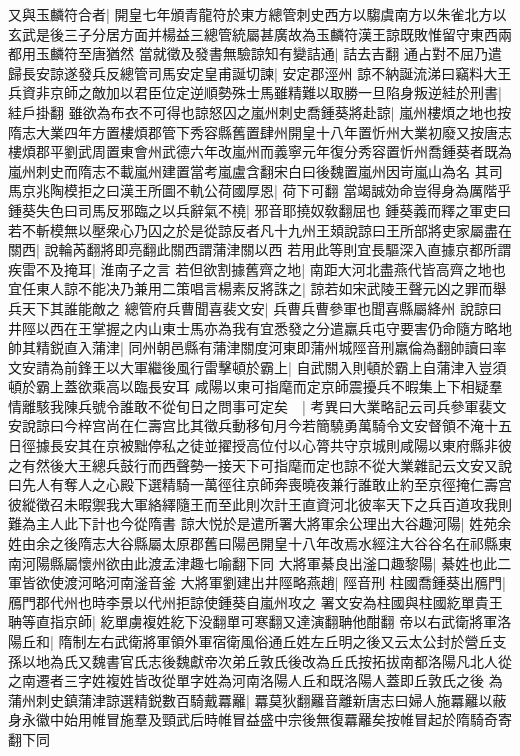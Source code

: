又與玉麟符合者|{
	開皇七年頒青龍符於東方總管刺史西方以騶虞南方以朱雀北方以玄武是後三子分居方面并楊益三總管統屬甚廣故為玉麟符漢王諒既敗惟留守東西兩都用玉麟符至唐猶然}
當就徵及發書無驗諒知有變詰通|{
	詰去吉翻}
通占對不屈乃遣歸長安諒遂發兵反總管司馬安定皇甫誕切諫|{
	安定郡涇州}
諒不納誕流涕曰竊料大王兵資非京師之敵加以君臣位定逆順勢殊士馬雖精難以取勝一旦陷身叛逆絓於刑書|{
	絓戶掛翻}
雖欲為布衣不可得也諒怒囚之嵐州刺史喬鍾葵將赴諒|{
	嵐州樓煩之地也按隋志大業四年方置樓煩郡管下秀容縣舊置肆州開皇十八年置忻州大業初廢又按唐志樓煩郡平劉武周置東會州武德六年改嵐州而義寧元年復分秀容置忻州喬鍾葵者既為嵐州刺史而隋志不載嵐州建置當考嵐盧含翻宋白曰後魏置嵐州因岢嵐山為名}
其司馬京兆陶模拒之曰漢王所圖不軌公荷國厚恩|{
	荷下可翻}
當竭誠効命豈得身為厲階乎鍾葵失色曰司馬反邪臨之以兵辭氣不橈|{
	邪音耶撓奴敎翻屈也}
鍾葵義而釋之軍吏曰若不斬模無以壓衆心乃囚之於是從諒反者凡十九州王頍說諒曰王所部將吏家屬盡在關西|{
	說輪芮翻將即亮翻此關西謂蒲津關以西}
若用此等則宜長驅深入直據京都所謂疾雷不及掩耳|{
	淮南子之言}
若但欲割據舊齊之地|{
	南距大河北盡燕代皆高齊之地也}
宜任東人諒不能决乃兼用二策唱言楊素反將誅之|{
	諒若如宋武陵王聲元凶之罪而舉兵天下其誰能敵之}
總管府兵曹聞喜裴文安|{
	兵曹兵曹參軍也聞喜縣屬絳州}
說諒曰井陘以西在王掌握之内山東士馬亦為我有宜悉發之分遣羸兵屯守要害仍命隨方略地帥其精鋭直入蒲津|{
	同州朝邑縣有蒲津關度河東即蒲州城陘音刑羸倫為翻帥讀曰率}
文安請為前鋒王以大軍繼後風行雷擊頓於霸上|{
	自武關入則頓於霸上自蒲津入豈須頓於霸上蓋欲乘高以臨長安耳}
咸陽以東可指麾而定京師震擾兵不暇集上下相疑羣情離駭我陳兵號令誰敢不從旬日之問事可定矣　|{
	考異曰大業略記云司兵參軍裴文安說諒曰今梓宫尚在仁壽宫比其徵兵動移旬月今若簡驍勇萬騎令文安督領不淹十五日徑據長安其在京被黜停私之徒並擢授高位付以心膂共守京城則咸陽以東府縣非彼之有然後大王總兵鼓行而西聲勢一接天下可指麾而定也諒不從大業雜記云文安又說曰先人有奪人之心殿下選精騎一萬徑往京師奔喪曉夜兼行誰敢止約至京徑掩仁壽宫彼縱徵召未暇禦我大軍絡繹隨王而至此則次計王直資河北彼率天下之兵百道攻我則難為主人此下計也今從隋書}
諒大悦於是遣所署大將軍余公理出大谷趣河陽|{
	姓苑余姓由余之後隋志大谷縣屬太原郡舊曰陽邑開皇十八年改焉水經注大谷谷名在祁縣東南河陽縣屬懷州欲由此渡孟津趣七喻翻下同}
大將軍綦良出滏口趣黎陽|{
	綦姓也此二軍皆欲使渡河略河南滏音釜}
大將軍劉建出井陘略燕趙|{
	陘音刑}
柱國喬鍾葵出鴈門|{
	鴈門郡代州也時李景以代州拒諒使鍾葵自嵐州攻之}
署文安為柱國與柱國紇單貴王聃等直指京師|{
	紇單虜複姓紇下没翻單可寒翻又達演翻聃他酣翻}
帝以右武衛將軍洛陽丘和|{
	隋制左右武衛將軍領外軍宿衛風俗通丘姓左丘明之後又云太公封於營丘支孫以地為氏又魏書官氏志後魏獻帝次弟丘敦氏後改為丘氏按拓拔南都洛陽凡北人從之南遷者三字姓複姓皆改從單字姓為河南洛陽人丘和既洛陽人蓋即丘敦氏之後}
為蒲州刺史鎮蒲津諒選精鋭數百騎戴羃䍦|{
	羃莫狄翻䍦音離新唐志曰婦人施羃䍦以蔽身永徽中始用帷冒施羣及頸武后時帷冒益盛中宗後無復羃䍦矣按帷冒起於隋騎奇寄翻下同}
